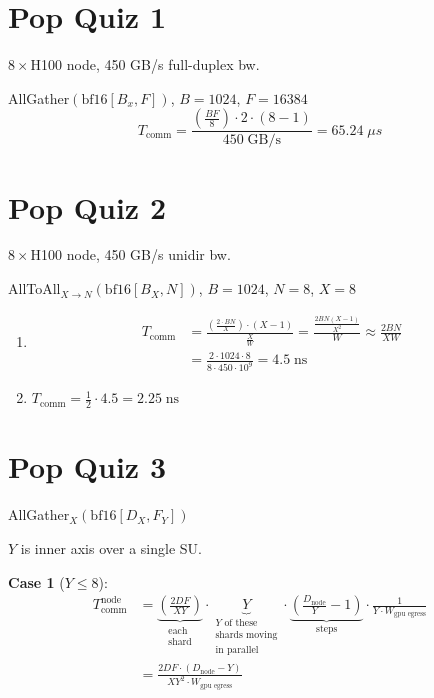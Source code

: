 \documentclass[11pt]{article}
\newcommand{\Tcomm}{T_{\text{comm}}}
\begin{document}
\section*{Pop Quiz 1}

$8 \times$H100 node, 450 GB/s full-duplex bw.

AllGather$(\text{bf16}[B_x, F])$, \quad $B = 1024$, \quad $F = 16384$
\[
\Tcomm = \frac{\left(\frac{BF}{8}\right) \cdot 2 \cdot (8 - 1)}{450 \;\text{GB/s}} = 65.24 \;\mu s
\]

\section*{Pop Quiz 2}

$8 \times$H100 node, 450 GB/s unidir bw.

AllToAll$_{X \to N}(\text{bf16}[B_X, N])$, \quad $B = 1024$, $N = 8$, $X = 8$

\begin{enumerate}[label=(\roman*)]
    \item \begin{align*}
    \Tcomm &= \frac{\left(\frac{2 \cdot BN}{X}\right) \cdot (X-1)}{\frac{X}{W}} = \frac{\frac{2BN(X-1)}{X^2}}{W} \approx \frac{2BN}{XW} \\
    &= \frac{2 \cdot 1024 \cdot 8}{8 \cdot 450 \cdot 10^9} = 4.5 \;\text{ns}
    \end{align*}

    \item $\Tcomm = \frac{1}{2} \cdot 4.5 = 2.25 \;\text{ns}$
\end{enumerate}

\section*{Pop Quiz 3}

AllGather$_X(\text{bf16}[D_X, F_Y])$

$Y$ is inner axis over a single SU.

\textbf{Case 1} ($Y \leq 8$):
\begin{align*}
\Tcomm^{\text{node}} &= \underbrace{\left(\frac{2DF}{XY}\right)}_{\substack{\text{each}\\ \text{shard}}} \cdot \underbrace{Y}_{\substack{Y \text{ of these}\\ \text{shards moving}\\ \text{in parallel}}} \cdot \underbrace{\left(\frac{D_{\text{node}}}{Y} - 1\right)}_{\text{steps}} \cdot \frac{1}{Y \cdot W_{\text{gpu egress}}} \\
&= \frac{2DF \cdot (D_{\text{node}} - Y)}{XY^2 \cdot W_{\text{gpu egress}}}
\end{align*}
\end{document}
